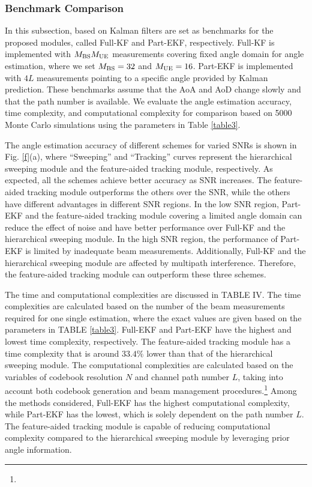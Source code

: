 \documentclass[journal,12pt,onecolumn,draftclsnofoot,]{IEEEtran}
\begin{document}
{\color{black}
\subsubsection{Benchmark Comparison}
In this subsection, \cite{a1001,a100101} based on Kalman filters are set as benchmarks for the proposed modules, called Full-KF and Part-EKF, respectively. 
Full-KF is implemented with $M_{\rm BS}M_{\rm UE}$ measurements covering fixed angle domain for angle estimation, where we set $M_{\rm BS}=32$ and $M_{\rm UE}=16$. 
Part-EKF is implemented with $4L$ measurements pointing to a specific angle provided by Kalman prediction. 
These benchmarks assume that the AoA and AoD change slowly and that the path number is available. 
We evaluate the angle estimation accuracy, time complexity, and computational complexity for comparison based on 5000 Monte Carlo simulations using the parameters in Table \ref{table3}. 

The angle estimation accuracy of different schemes for varied SNRs is shown in Fig. \ref{f}(a), where ``Sweeping'' and ``Tracking'' curves represent the hierarchical sweeping module and the feature-aided tracking module, respectively. 
As expected, all the schemes achieve better accuracy as SNR increases. 
The feature-aided tracking module outperforms the others over the SNR, while the others have different advantages in different SNR regions. 
In the low SNR region, Part-EKF and the feature-aided tracking module covering a limited angle domain can reduce the effect of noise and have better performance over Full-KF and the hierarchical sweeping module. 
In the high SNR region, the performance of Part-EKF is limited by inadequate beam measurements. 
Additionally, Full-KF and the hierarchical sweeping module are affected by multipath interference. Therefore, the feature-aided tracking module can outperform these three schemes. 


The time and computational complexities are discussed in TABLE IV. 
The time complexities are calculated based on the number of the beam measurements required for one single estimation, where the exact values are given based on the parameters in TABLE \ref{table3}.
Full-EKF and Part-EKF have the highest and lowest time complexity, respectively. 
The feature-aided tracking module has a time complexity that is around $33.4\%$ lower than that of the hierarchical sweeping module. 
{\color{black}
The computational complexities are calculated based on the variables of codebook resolution $N$ and channel path number $L$, taking into account both codebook generation and beam management procedures.\footnote{{\color{black}{The codebooks of the hierarchical sweeping module and Full-EKF can be partially pre-generated to trade off storage complexity for reduced computational complexity, thus accommodating different hardware conditions.}}} Among the methods considered, Full-EKF has the highest computational complexity, while Part-EKF has the lowest, which is solely dependent on the path number $L$. The feature-aided tracking module is capable of reducing computational complexity compared to the hierarchical sweeping module by leveraging prior angle information.
}

}
\end{document}
